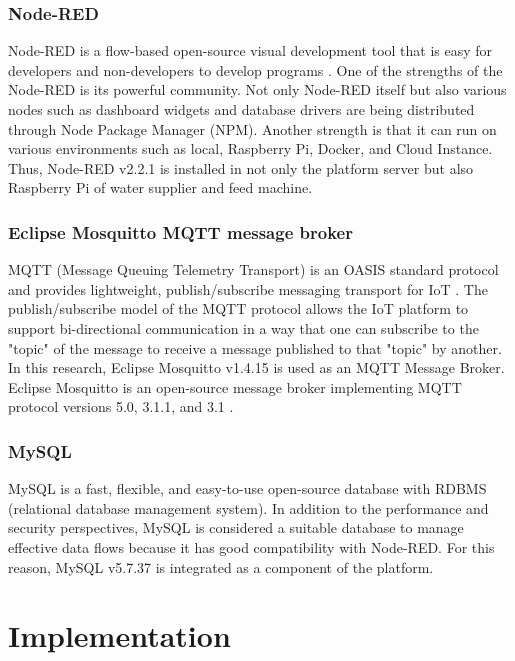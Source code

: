 ﻿\documentclass[conference]{IEEEtran}
\begin{document}
\subsubsection{Node-RED}
Node-RED is a flow-based open-source visual development tool that is easy for developers and non-developers to develop programs \cite{b12}.
One of the strengths of the Node-RED is its powerful community.
Not only Node-RED itself but also various nodes such as dashboard widgets and database drivers are being distributed through Node Package Manager (NPM).
Another strength is that it can run on various environments such as local, Raspberry Pi, Docker, and Cloud Instance.
Thus, Node-RED v2.2.1 is installed in not only the platform server but also Raspberry Pi of water supplier and feed machine.

\subsubsection{Eclipse Mosquitto MQTT message broker}
MQTT (Message Queuing Telemetry Transport) is an OASIS standard protocol and provides lightweight, publish/subscribe messaging transport for IoT \cite{b8}.
The publish/subscribe model of the MQTT protocol allows the IoT platform to support bi-directional communication in a way that one can subscribe to the "topic" of the message to receive a message published to that "topic" by another.
In this research, Eclipse Mosquitto v1.4.15 is used as an MQTT Message Broker.
Eclipse Mosquitto is an open-source message broker implementing MQTT protocol versions 5.0, 3.1.1, and 3.1 \cite{b13}.

\subsubsection{MySQL}
MySQL is a fast, flexible, and easy-to-use open-source database with RDBMS (relational database management system).
In addition to the performance and security perspectives, MySQL is considered a suitable database to manage effective data flows because it has good compatibility with Node-RED.
For this reason, MySQL v5.7.37 is integrated as a component of the platform.

\section{Implementation}
\end{document}
